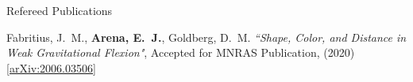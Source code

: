 \documentclass{resume} %
\begin{document}

\begin{rSection}{Refereed Publications}

\begin{etaremune}
\item {Fabritius}, J.~M., \textbf{{Arena}, E.~J.}, {Goldberg}, D.~M. \textit{``Shape, Color, and Distance in Weak Gravitational Flexion"}, Accepted for MNRAS Publication, (2020) \href{https://arxiv.org/abs/2006.03506}{[arXiv:2006.03506]}
\end{etaremune}

\end{rSection}

\end{document}
